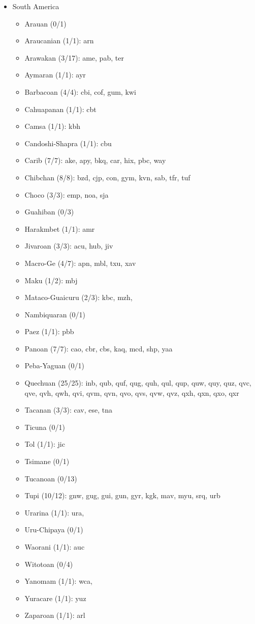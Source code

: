 \begin{itemize}[label={},leftmargin=0cm,labelindent=5pt,itemindent=0pt]
  \item South America
    \begin{itemize}[label={},leftmargin=!,labelindent=5pt,itemindent=-15pt]
  	\item Arauan (0/1)
  	\item Araucanian (1/1): arn
  	\item Arawakan (3/17): ame, pab, ter
  	\item Aymaran (1/1): ayr
  	\item Barbacoan (4/4): cbi, cof, gum, kwi
  	\item Cahuapanan (1/1): cbt
  	\item Camsa (1/1): kbh
  	\item Candoshi-Shapra (1/1): cbu
  	\item Carib (7/7): ake, apy, bkq, car, hix, pbc, way
  	\item Chibchan (8/8): bzd, cjp, con, gym, kvn, sab, tfr, tuf
  	\item Choco (3/3): emp, noa, sja
  	\item Guahiban (0/3)
  	\item Harakmbet (1/1): amr
  	\item Jivaroan (3/3): acu, hub, jiv
  	\item Macro-Ge (4/7): apn, mbl, txu, xav
  	\item Maku (1/2): mbj
  	\item Mataco-Guaicuru (2/3): kbc, mzh,
  	\item Nambiquaran (0/1)
  	\item Paez (1/1): pbb
  	\item Panoan (7/7): cao, cbr, cbs, kaq, mcd, shp, yaa
  	\item Peba-Yaguan (0/1)
  	\item Quechuan (25/25): inb, qub, quf, qug, quh, qul, qup, quw, quy, quz, qvc, qve, qvh, qwh, qvi, qvm, qvn, qvo, qvs, qvw, qvz, qxh, qxn, qxo, qxr
  	\item Tacanan (3/3): cav, ese, tna
  	\item Ticuna (0/1)
  	\item Tol (1/1): jic
  	\item Tsimane (0/1)
  	\item Tucanoan (0/13)
  	\item Tupi (10/12): gnw, gug, gui, gun, gyr, kgk, mav, myu, srq, urb
  	\item Urarina (1/1): ura,
  	\item Uru-Chipaya (0/1)
  	\item Waorani (1/1): auc
  	\item Witotoan (0/4)
  	\item Yanomam (1/1): wca,
  	\item Yuracare (1/1): yuz
  	\item Zaparoan (1/1): arl
    \end{itemize}

\end{itemize}
